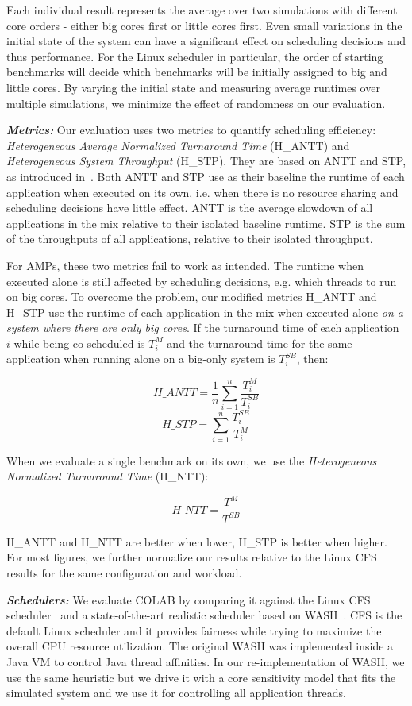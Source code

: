 Each individual result represents the average over two simulations with different core orders - either big cores first or little cores first. Even small variations in the initial state of the system can have a significant effect on scheduling decisions and thus performance. For the Linux scheduler in particular, the order of starting benchmarks will decide which benchmarks will be initially assigned to big and little cores. By varying the initial state and measuring average runtimes over multiple simulations, we minimize the effect of randomness on our evaluation.

\textbf{\textit{Metrics:}} Our evaluation uses two metrics to quantify scheduling efficiency: {\it Heterogeneous Average Normalized Turnaround Time} (H\_ANTT) and {\it Heterogeneous System Throughput} (H\_STP). They are based on ANTT and STP, as introduced in~\cite{eyerman2008system}. Both ANTT and STP use as their baseline the runtime of each application when executed on its own, i.e. when there is no resource sharing and scheduling decisions have little effect. ANTT is the average slowdown of all applications in the mix relative to their isolated baseline runtime. STP is the sum of the throughputs of all applications, relative to their isolated throughput.

For AMPs, these two metrics fail to work as intended. The runtime when executed alone is still affected by scheduling decisions, e.g. which threads to run on big cores. To overcome the problem, our modified metrics H\_ANTT and H\_STP use the runtime of each application in the mix when executed alone \emph{on a system where there are only big cores}. If the turnaround time of each application $i$ while being co-scheduled is $T^{M}_i$ and the turnaround time for the same application when running alone on a big-only system is $T^{SB}_i$, then:

$$ H\_ANTT = \frac{1}{n}\sum^{n}_{i=1}\frac{T^{M}_i}{T^{SB}_i}$$
$$ H\_STP = \sum^{n}_{i=1}\frac{T^{SB}_i}{T^{M}_i}$$

When we evaluate a single benchmark on its own, we use the {\it Heterogeneous Normalized Turnaround Time} (H\_NTT):

$$ H\_NTT = \frac{T^{M}}{T^{SB}}$$

H\_ANTT and H\_NTT are better when lower, H\_STP is better when higher. For most figures, we further normalize our results relative to the Linux CFS results for the same configuration and workload.

\textbf{\textit{Schedulers:}}
We evaluate COLAB by comparing it against the Linux CFS scheduler~\cite{molnar2007cfs} and a state-of-the-art realistic scheduler based on WASH~\cite{jibaja2016portable}. CFS is the default Linux scheduler and it provides fairness while trying to maximize the overall CPU resource utilization. The original WASH was implemented inside a Java VM to control Java thread affinities. In our re-implementation of WASH, we use the same heuristic but we drive it with a core sensitivity model that fits the simulated system and we use it for controlling all application threads. 

